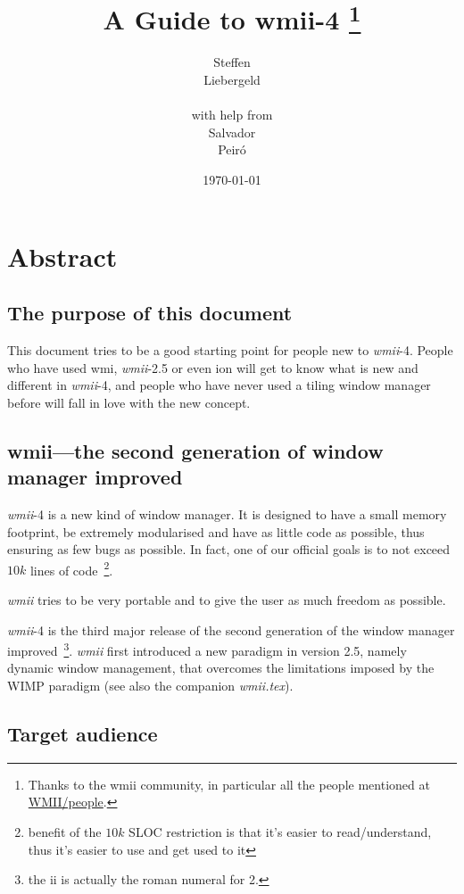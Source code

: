 \documentclass[12pt,a4paper]{article} %
\date{\today}
\author{
Steffen\\Liebergeld \\\\
\small{with help from}\\
Salvador\\Peir\'o
}
\title{A Guide to wmii-4%
\thanks{Thanks to the wmii community, in particular all the 
people mentioned at \href{http://wmii.de/index.php/WMII/People}{WMII/people}.}
}
\newcommand{\wmii}{\emph{wmii}}
\begin{document}
\maketitle

\tableofcontents

\newpage

\section{Abstract}

  \subsection{The purpose of this document}

    This document tries to be a good starting point for people new to
    \wmii-4.  People who have used wmi, \wmii-2.5 or even ion will get
    to know what is new and different in \wmii-4, and people who have
    never used a tiling window manager before will fall in love with
    the new concept.
  
  \subsection{wmii---the second generation of window manager improved}

    \wmii-4 is a new kind of window manager. It is designed to have a
    small memory footprint, be extremely modularised and have as
    little code as possible, thus ensuring as few bugs as possible. In
    fact, one of our official goals is to not exceed $10 k$ lines of
    code~\footnote{ benefit of the $10 k$ SLOC restriction is that
    it's easier to read/understand, thus it's easier to use and get
    used to it}.

    \wmii{} tries to be very portable and to give the user as much
    freedom as possible.

    \wmii-4 is the third major release of the second generation of the
    window manager improved~\footnote{ the ii is actually the roman
    numeral for 2.}.  \wmii{} first introduced a new paradigm in version
    2.5, namely dynamic window management, that overcomes the
    limitations imposed by the WIMP paradigm (see also the companion
    \emph{wmii.tex}).
  
  \subsection{Target audience}
\end{document}
